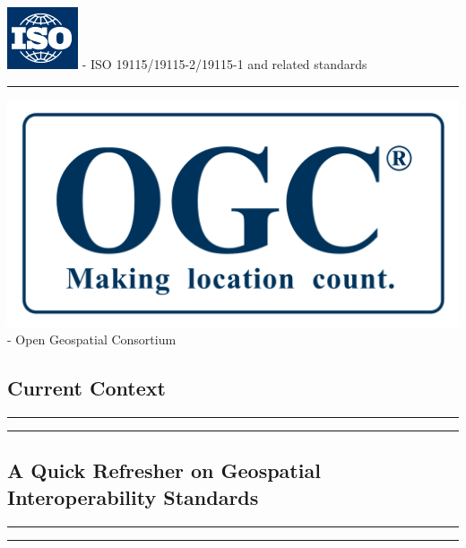 \includegraphics{images/ISO_-_International_Organization_for_Standardization.png}
- ISO 19115/19115-2/19115-1 and related standards

\begin{center}\rule{0.5\linewidth}{\linethickness}\end{center}

\includegraphics{images/OGC_Logo_2D_Blue_x_0_0.png} - Open Geospatial
Consortium

\subsection{Current Context}\label{current-context}

\begin{center}\rule{0.5\linewidth}{\linethickness}\end{center}

\begin{center}\rule{0.5\linewidth}{\linethickness}\end{center}

\subsection{A Quick Refresher on Geospatial Interoperability
Standards}\label{a-quick-refresher-on-geospatial-interoperability-standards}

\begin{center}\rule{0.5\linewidth}{\linethickness}\end{center}

\begin{center}\rule{0.5\linewidth}{\linethickness}\end{center}
